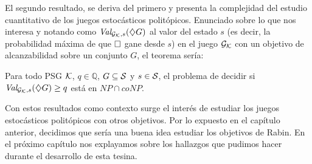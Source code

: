 El segundo resultado, se deriva del primero y presenta la complejidad del
estudio cuantitativo de los juegos estocásticos politópicos. Enunciado sobre lo
que nos interesa y notando como $\textit{Val}_{\mathcal{G}_{\mathcal{K}},s}(\diamondsuit G)$ al valor del estado $s$
(es decir, la probabilidad máxima de que $\square$ gane desde $s$) en el juego
$\mathcal{G}_{\mathcal{K}}$ con un objetivo de alcanzabilidad sobre un conjunto $G$, el teorema
sería:

\begin{theorem}
	Para todo PSG $\mathcal{K}$, $q \in \mathbb{Q}$, $G \subseteq \mathcal{S}$ y $s \in \mathcal{S}$, el problema de decidir si $\textit{Val}_{\mathcal{G}_{\mathcal{K}}, s}(\diamondsuit G) \geq q$ está en $NP \cap coNP$.
\end{theorem}

Con estos resultados como contexto surge el interés de estudiar los juegos
estocásticos politópicos con otros objetivos. Por lo expuesto en el capítulo
anterior, decidimos que sería una buena idea estudiar los objetivos de Rabin.
En el próximo capítulo nos explayamos sobre los hallazgos que pudimos hacer
durante el desarrollo de esta tesina.




